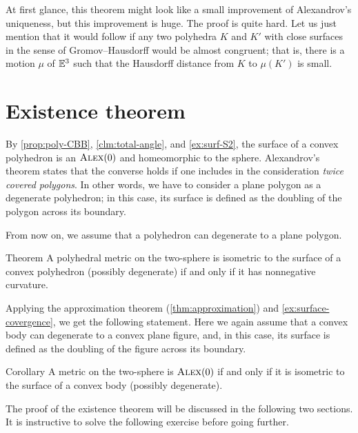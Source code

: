 At first glance, this theorem might look like a small improvement of Alexandrov's uniqueness,
but this improvement is huge.
The proof is quite hard.
Let us just mention that it would follow if any two polyhedra $K$ and $K'$  with close surfaces in the sense of Gromov--Hausdorff would be almost congruent;
that is, there is a motion $\mu$ of $\mathbb{E}^3$ such that the Hausdorff distance from $K$ to $\mu(K')$ is small.


\section{Existence theorem}

By \ref{prop:poly-CBB}, \ref{clm:total-angle}, and \ref{ex:surf-S2}, the surface of a convex polyhedron is an $\textsc{Alex}(0)$ and homeomorphic to the sphere.
Alexandrov's theorem states that the converse holds if one includes in the consideration \textit{twice covered polygons}.
In other words, we have to consider a plane polygon as a degenerate polyhedron;
in this case, its surface is defined as the doubling of the polygon across its boundary.

From now on, we assume that a polyhedron can degenerate to a plane polygon.

\begin{thm}{Theorem}\label{thm:alexandrov-first}
A polyhedral metric on the two-sphere is isometric to the surface of a convex polyhedron (possibly degenerate) if and only if it has nonnegative curvature.

\end{thm}

Applying the approximation theorem (\ref{thm:approximation}) and \ref{ex:surface-covergence}, we get the following statement.
Here we again assume that a convex body can degenerate to a convex plane figure,
and, in this case, its surface is defined as the doubling of the figure across its boundary.

\begin{thm}{Corollary}\label{cor:Alex0-convex}
A metric on the two-sphere is $\textsc{Alex}(0)$ if and only if it is isometric to the surface of a convex body (possibly degenerate).

\end{thm}

The proof of the existence theorem will be discussed in the following two sections.
It is instructive to solve the following exercise before going further.


